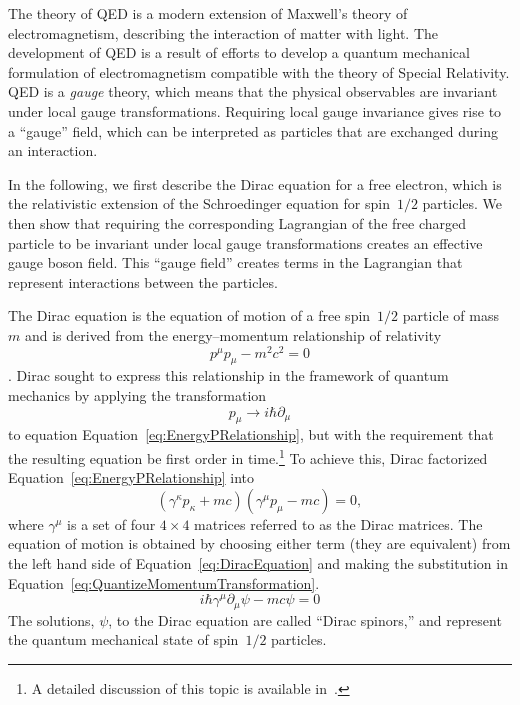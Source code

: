 The theory of QED is a modern extension of Maxwell's theory of
electromagnetism, describing the interaction of matter with light.  The
development of QED is a result of efforts to develop a quantum mechanical
formulation of electromagnetism compatible with the theory of Special Relativity.
QED is a \emph{gauge} theory, which means that the physical observables are
invariant under local gauge transformations.  Requiring local gauge
invariance gives rise to a ``gauge'' field, which can be interpreted as 
particles that are exchanged during an interaction.  

In the following, we first describe the Dirac equation for a free electron,
which is the relativistic extension of the Schroedinger equation for spin~$1/2$
particles.  We then show that requiring the corresponding Lagrangian of the free
charged particle to be invariant under local gauge transformations creates an
effective gauge boson field.  This ``gauge field'' creates terms in the
Lagrangian that represent interactions between the particles.

The Dirac equation is the equation of motion of a free spin~$1/2$ particle of
mass~$m$ and is derived from the energy--momentum relationship of relativity
\begin{equation}
  p^{\mu}p_\mu - m^2c^2 = 0
  \label{eq:EnergyPRelationship}
\end{equation}.
Dirac sought to express this relationship in the framework of quantum mechanics
by applying the transformation
\begin{equation}
  p_\mu \to i \hbar \partial_\mu 
  \label{eq:QuantizeMomentumTransformation}
\end{equation}
to equation Equation~\ref{eq:EnergyPRelationship}, but with the requirement that
the resulting equation be first order in time.\footnote{A detailed
discussion of this topic is available in~\cite{Griffiths:IntroParticle}.}
To achieve this, Dirac factorized Equation~\ref{eq:EnergyPRelationship} into 
\begin{equation}
  (\gamma^\kappa p_\kappa + mc)(\gamma^\mu p_\mu - mc) = 0,
  \label{eq:DiracEquation}
\end{equation}
where $\gamma^\mu$ is a set of four $4\times4$ matrices referred to as the Dirac
matrices.  The equation of motion is obtained by choosing either term (they are
equivalent) from the
left hand side of Equation~\ref{eq:DiracEquation} and
making the substitution in Equation~\ref{eq:QuantizeMomentumTransformation}.
\begin{equation}
  i \hbar \gamma^\mu \partial_\mu \psi - mc \psi = 0
  \label{eq:DiracEquation}
\end{equation}
The solutions, $\psi$, to the Dirac equation are called ``Dirac spinors,'' and
represent the quantum mechanical state of spin~$1/2$ particles.

